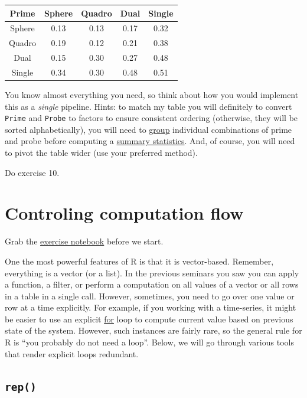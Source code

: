 \documentclass[
]{book}
\begin{document}
\begin{tabular}{c|c|c|c|c}
\hline
Prime & Sphere & Quadro & Dual & Single\\
\hline
Sphere & 0.13 & 0.13 & 0.17 & 0.32\\
\hline
Quadro & 0.19 & 0.12 & 0.21 & 0.38\\
\hline
Dual & 0.15 & 0.30 & 0.27 & 0.48\\
\hline
Single & 0.34 & 0.30 & 0.48 & 0.51\\
\hline
\end{tabular}

You know almost everything you need, so think about how you would implement this as a \emph{single} pipeline. Hints: to match my table you will definitely to convert \texttt{Prime} and \texttt{Probe} to factors to ensure consistent ordering (otherwise, they will be sorted alphabetically), you will need to \href{https://dplyr.tidyverse.org/reference/group_by.html}{group} individual combinations of prime and probe before computing a \href{https://dplyr.tidyverse.org/reference/summarise.html}{summary statistics}. And, of course, you will need to pivot the table wider (use your preferred method).

Do exercise 10.

\hypertarget{controling-computation-flow}{%
\chapter{Controling computation flow}\label{controling-computation-flow}}

Grab the \href{notebooks/Seminar\%2009\%20-\%20control\%20flow.Rmd}{exercise notebook} before we start.

One the most powerful features of R is that it is vector-based. Remember, everything is a vector (or a list). In the previous seminars you saw you can apply a function, a filter, or perform a computation on all values of a vector or all rows in a table in a single call. However, sometimes, you need to go over one value or row at a time explicitly. For example, if you working with a time-series, it might be easier to use an explicit \href{https://stat.ethz.ch/R-manual/R-devel/library/base/html/Control.html}{for} loop to compute current value based on previous state of the system. However, such instances are fairly rare, so the general rule for R is ``you probably do not need a loop''. Below, we will go through various tools that render explicit loops redundant.

\hypertarget{rep}{%
\section{\texorpdfstring{\texttt{rep()}}{rep()}}\label{rep}}
\end{document}
